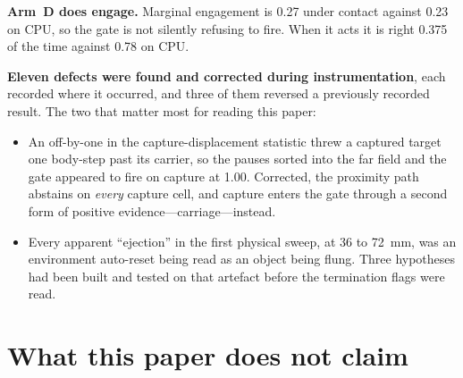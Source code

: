 \documentclass[10pt]{article}
\begin{document}
\textbf{Arm~D does engage.} Marginal engagement is 0.27 under contact against
0.23 on CPU, so the gate is not silently refusing to fire. When it acts it is
right 0.375 of the time against 0.78 on CPU.

\textbf{Eleven defects were found and corrected during instrumentation}, each
recorded where it occurred, and three of them reversed a previously recorded
result. The two that matter most for reading this paper:

\begin{itemize}[leftmargin=*]
\item An off-by-one in the capture-displacement statistic threw a captured target
one body-step past its carrier, so the pauses sorted into the far field and the
gate appeared to fire on capture at 1.00. Corrected, the proximity path abstains
on \emph{every} capture cell, and capture enters the gate through a second form
of positive evidence---carriage---instead.
\item Every apparent ``ejection'' in the first physical sweep, at 36 to 72~mm,
was an environment auto-reset being read as an object being flung. Three
hypotheses had been built and tested on that artefact before the termination
flags were read.
\end{itemize}

\section{What this paper does not claim}
\label{sec:notclaimed}
\end{document}

